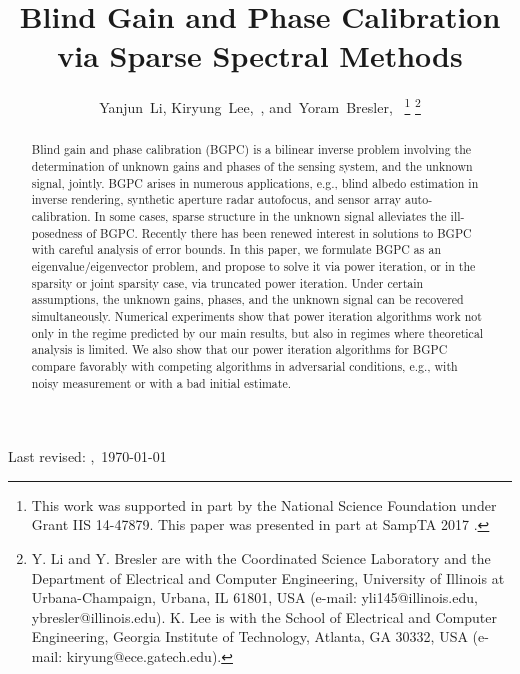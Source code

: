 \documentclass[11pt,journal]{IEEEtran}
\begin{document}


\title{Blind Gain and Phase Calibration \\via Sparse Spectral Methods}

\author{Yanjun~Li,
        Kiryung~Lee,~,
        and~Yoram~Bresler,~%
\thanks{This work was supported in part by the National Science Foundation under Grant IIS 14-47879. This paper was presented in part at SampTA 2017 \cite{Li2017}.}
\thanks{Y. Li and Y. Bresler are with the Coordinated Science Laboratory and the Department
of Electrical and Computer Engineering, University of Illinois at
Urbana-Champaign, Urbana, IL 61801, USA (e-mail: yli145@illinois.edu, ybresler@illinois.edu). 
K. Lee is with the School of Electrical and Computer Engineering, Georgia Institute of Technology, Atlanta, GA 30332, USA (e-mail: kiryung@ece.gatech.edu).}}


%
{Last revised: \currenttime,~\today}

\maketitle


\begin{abstract}
Blind gain and phase calibration (BGPC) is a bilinear inverse problem involving the determination of unknown gains and phases of the sensing system, and the unknown signal, jointly. BGPC arises in numerous applications, e.g., blind albedo estimation in inverse rendering, synthetic aperture radar autofocus, and sensor array auto-calibration. In some cases, sparse structure in the unknown signal alleviates the ill-posedness of BGPC. Recently there has been renewed interest in solutions to BGPC with careful analysis of error bounds. In this paper, we formulate BGPC as an eigenvalue/eigenvector problem, and propose to solve it via power iteration, or in the sparsity or joint sparsity case, via truncated power iteration. Under certain assumptions, the unknown gains, phases, and the unknown signal can be recovered simultaneously. Numerical experiments show that power iteration algorithms work not only in the regime predicted by our main results, but also in regimes where theoretical analysis is limited. We also show that our power iteration algorithms for BGPC compare favorably with competing algorithms in adversarial conditions, e.g., with noisy measurement or with a bad initial estimate.
\end{abstract}
\end{document}

